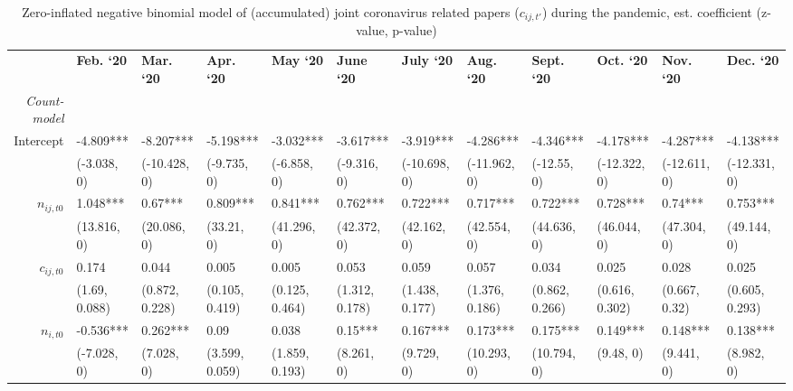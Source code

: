 {
\begin{landscape}

\begin{table}[ht]
\begin{threeparttable}
\centering
\caption{Zero-inflated negative binomial model of (accumulated) joint coronavirus related papers  ($c_{ij,t'}$) during the pandemic, est. coefficient (z-value, p-value)}
\label{tab:jointCRR}
\begin{tiny}
\begin{tabular}{rlllllllllll}
\hline\noalign{\smallskip}
    & {\bf Feb. `20} & {\bf Mar. `20} & {\bf Apr. `20} &  {\bf May `20}  &  {\bf June `20} &  {\bf July `20} &  {\bf Aug. `20} &  {\bf Sept. `20} &  {\bf Oct. `20} &  {\bf Nov. `20} &  {\bf Dec. `20}   \\ 
\noalign{\smallskip}\hline\noalign{\smallskip}
       	\textit{Count-model} & & & & & & & & & & & \\
\noalign{\smallskip}
  Intercept & -4.809*** & -8.207*** & -5.198*** & -3.032*** & -3.617*** & -3.919*** & -4.286*** & -4.346*** & -4.178*** & -4.287*** & -4.138*** \\ 
  & (-3.038, 0) & (-10.428, 0) & (-9.735, 0) & (-6.858, 0) & (-9.316, 0) & (-10.698, 0) & (-11.962, 0) & (-12.55, 0) & (-12.322, 0) & (-12.611, 0) & (-12.331, 0) \\ 
$n_{ij,t0}$ & 1.048*** & 0.67*** & 0.809*** & 0.841*** & 0.762*** & 0.722*** & 0.717*** & 0.722*** & 0.728*** & 0.74*** & 0.753*** \\ 
   & (13.816, 0) & (20.086, 0) & (33.21, 0) & (41.296, 0) & (42.372, 0) & (42.162, 0) & (42.554, 0) & (44.636, 0) & (46.044, 0) & (47.304, 0) & (49.144, 0) \\ 
  $c_{ij,t0}$ & 0.174 & 0.044 & 0.005 & 0.005 & 0.053 & 0.059 & 0.057 & 0.034 & 0.025 & 0.028 & 0.025 \\ 
   & (1.69, 0.088) & (0.872, 0.228) & (0.105, 0.419) & (0.125, 0.464) & (1.312, 0.178) & (1.438, 0.177) & (1.376, 0.186) & (0.862, 0.266) & (0.616, 0.302) & (0.667, 0.32) & (0.605, 0.293) \\ 
$n_{i,t0}$ & -0.536*** & 0.262*** & 0.09 & 0.038 & 0.15*** & 0.167*** & 0.173*** & 0.175*** & 0.149*** & 0.148*** & 0.138*** \\ 
   & (-7.028, 0) & (7.028, 0) & (3.599, 0.059) & (1.859, 0.193) & (8.261, 0) & (9.729, 0) & (10.293, 0) & (10.794, 0) & (9.48, 0) & (9.441, 0) & (8.982, 0) \\ 

\end{tabular}
\end{tiny}
\end{threeparttable}
\end{table}
\end{landscape}}
